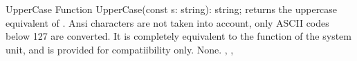 


\begin{function}{UpperCase}
\Declaration
Function UpperCase(const s: string): string;
\Description
{} returns the uppercase equivalent of . Ansi characters
are not taken into account, only ASCII codes below 127 are converted. It is
completely equivalent to the  function of the system unit, and is
provided for compatiibility only.
\Errors
None.
\SeeAlso
{}, , 
\Errors
\SeeAlso
\end{function}



